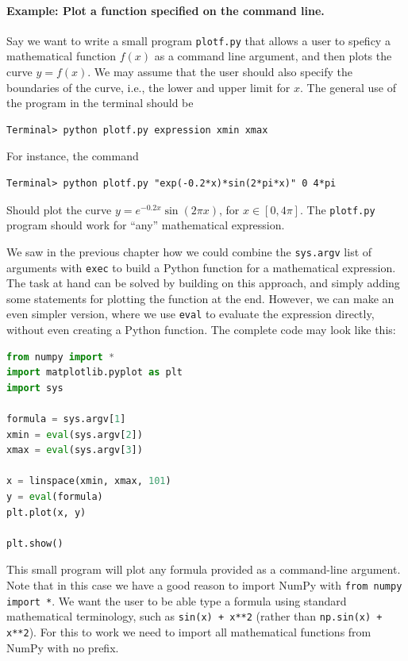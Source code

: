 \documentclass[graybox,envcountchap,sectrefs,final]{svmonodo}
\begin{document}
\paragraph{Example: Plot a function specified on the command line.}
Say we want to write a small program \texttt{plotf.py} that allows a user to speficy a mathematical function $f(x)$ as
a command line argument, and then plots the curve $y=f(x)$. We may assume that the user should also specify the
boundaries of the curve, i.e., the lower and upper limit for $x$. The general use of the program in the terminal
should be
\begin{Verbatim}[frame=lines,label=\fbox{{\tiny Terminal}},framesep=2.5mm,framerule=0.7pt]
Terminal> python plotf.py expression xmin xmax
\end{Verbatim}
For instance, the command
\begin{Verbatim}[frame=lines,label=\fbox{{\tiny Terminal}},framesep=2.5mm,framerule=0.7pt]
Terminal> python plotf.py "exp(-0.2*x)*sin(2*pi*x)" 0 4*pi
\end{Verbatim}
Should plot the curve $y = e^{-0.2x}\sin (2\pi x)$, for $x\in [0,4\pi]$.
The \texttt{plotf.py} program should work for ``any'' mathematical expression.

We saw in the previous chapter how we could combine the \texttt{sys.argv} list of arguments with \texttt{exec} to build a Python
function for a mathematical expression. The task at hand can be solved by building on this approach,
and simply adding some statements for plotting the function at the end. However, we can make an even simpler
version, where we use \texttt{eval} to evaluate the expression directly, without even creating a Python function. The
complete code may look like this:
\begin{lstlisting}[language=Python,style=blue1]
from numpy import *
import matplotlib.pyplot as plt
import sys

formula = sys.argv[1]
xmin = eval(sys.argv[2])
xmax = eval(sys.argv[3])

x = linspace(xmin, xmax, 101)
y = eval(formula)
plt.plot(x, y)

plt.show()
\end{lstlisting}
This small program will plot any formula provided as a command-line argument. Note that in this case we have a
good reason to import NumPy with \texttt{from numpy import *}. We want the user to be able type a formula using
standard mathematical terminology, such as \texttt{sin(x) + x**2} (rather than \texttt{np.sin(x) + x**2}). For this to
work we need to import all mathematical functions from NumPy with no prefix.
\end{document}

